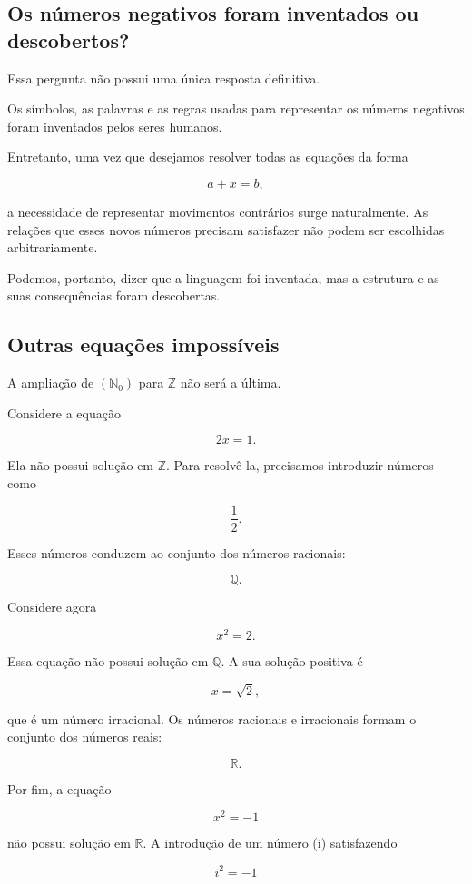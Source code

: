 \documentclass[12pt,a4paper]{article}
\begin{document}
\subsection{Os números negativos foram inventados ou descobertos?}

Essa pergunta não possui uma única resposta definitiva.

Os símbolos, as palavras e as regras usadas para representar os números
negativos foram inventados pelos seres humanos.

Entretanto, uma vez que desejamos resolver todas as equações da forma

\[
a+x=b,
\]

a necessidade de representar movimentos contrários surge naturalmente.
As relações que esses novos números precisam satisfazer não podem ser
escolhidas arbitrariamente.

Podemos, portanto, dizer que a linguagem foi inventada, mas a estrutura
e as suas consequências foram descobertas.

\subsection{Outras equações impossíveis}

A ampliação de $(\mathbb{N}_0)$ para $\mathbb{Z}$ não será a última.

Considere a equação

\[
2x=1.
\]

Ela não possui solução em $\mathbb{Z}$. Para resolvê-la, precisamos
introduzir números como

\[
\frac{1}{2}.
\]

Esses números conduzem ao conjunto dos números racionais:

\[
\mathbb{Q}.
\]

Considere agora

\[
x^2=2.
\]

Essa equação não possui solução em $\mathbb{Q}$. A sua solução positiva
é

\[
x=\sqrt{2},
\]

que é um número irracional. Os números racionais e irracionais formam o
conjunto dos números reais:

\[
\mathbb{R}.
\]

Por fim, a equação

\[
x^2=-1
\]

não possui solução em $\mathbb{R}$. A introdução de um número (i)
satisfazendo

\[
i^2=-1
\]
\end{document}
